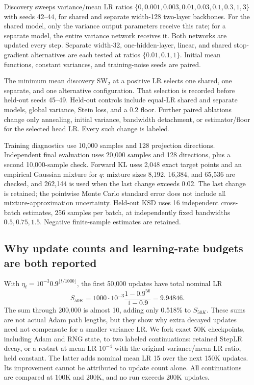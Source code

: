 \documentclass[11pt,a4paper]{article}
\begin{document}
Discovery sweeps variance/mean LR ratios
$\{0,0.001,0.003,0.01,0.03,0.1,0.3,1,3\}$ with seeds 42--44, for shared
and separate width-128 two-layer backbones. For the shared model, only the
variance output parameters receive this rate; for a separate model, the
entire variance network receives it. Both networks are updated every step.
Separate width-32, one-hidden-layer, linear, and shared stop-gradient
alternatives are each tested at ratios $\{0.01,0.1,1\}$. Initial mean
functions, constant variances, and training-noise seeds are paired.

The minimum mean discovery SW$_2$ at a positive LR selects one shared, one
separate, and one alternative configuration. That selection is recorded
before held-out seeds 45--49. Held-out controls include equal-LR shared and
separate models, global variance, Stein loss, and a $0.2$ floor. Further
paired ablations change only annealing, initial variance, bandwidth detachment,
or estimator/floor for the selected head LR. Every such change is labeled.

Training diagnostics use 10,000 samples and 128 projection directions.
Independent final evaluation uses 20,000 samples and 128 directions, plus a
second 10,000-sample check. Forward KL uses 2,048 exact target points and
an empirical Gaussian mixture for $q$: mixture sizes 8,192, 16,384, and
65,536 are checked, and 262,144 is used when the last change exceeds 0.02.
The last change is retained; the pointwise Monte Carlo standard error does
not include all mixture-approximation uncertainty. Held-out KSD uses 16
independent cross-batch estimates, 256 samples per batch, at independently
fixed bandwidths $0.5,0.75,1.5$. Negative finite-sample estimates are retained.

\subsection{Why update counts and learning-rate budgets are both reported}
With $\eta_t=10^{-3}0.9^{\lfloor t/1000\rfloor}$, the first 50,000 updates
have total nominal LR
\[
 S_{50K}=1000\cdot10^{-3}\frac{1-0.9^{50}}{1-0.9}=9.94846.
\]
The sum through 200,000 is almost 10, adding only 0.518\% to $S_{50K}$.
These sums are not actual Adam path lengths, but they show why extra decayed
updates need not compensate for a smaller variance LR. We fork exact 50K
checkpoints, including Adam and RNG state, to two labeled continuations:
retained StepLR decay, or a restart at mean LR $10^{-4}$ with the original
variance/mean LR ratio, held constant. The latter adds nominal mean LR 15
over the next 150K updates. Its improvement cannot be attributed to update
count alone. All continuations are compared at 100K and 200K, and no run
exceeds 200K updates.
\end{document}
